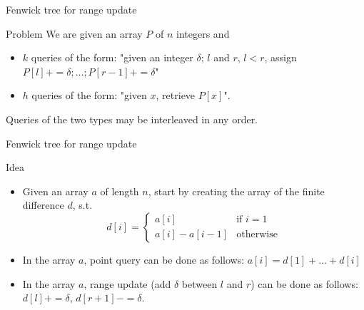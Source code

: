 \documentclass{beamer}
\begin{document}
\begin{frame}{Fenwick tree for range update}
\begin{block}{Problem}
We are given an array $P$ of $n$ integers and
\begin{itemize}
\item $k$ queries of the form: "given an integer $\delta$; $l$ and $r$, $l < r$, assign $P[l] += \delta; \dots; P[r-1] += \delta$"
\item $h$ queries of the form: "given $x$, retrieve $P[x]$".
\end{itemize}

Queries of the two types may be interleaved in any order.
\end{block}
\end{frame}
\begin{frame}{Fenwick tree for range update}
\begin{block}{Idea}
\begin{itemize}
\item Given an array $a$ of length $n$, start by creating the array of the finite difference $d$, s.t.
$$
d[i] = \begin{cases}
a[i] & \mbox{if } i = 1\\
a[i] - a[i-1] & \mbox{otherwise}
\end{cases}
$$
\item In the array $a$, point query can be done as follows: $a[i] = d[1] + \dots + d[i]$
\item In the array $a$, range update (add $\delta$ between $l$ and $r$) can be done as follows: $d[l] += \delta$, $d[r + 1] -= \delta$.
\end{itemize}
\end{block}
\end{frame}
\end{document}
